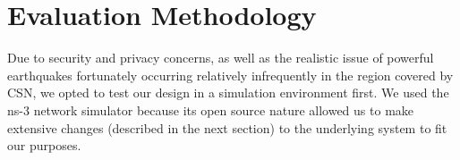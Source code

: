 \documentclass[conference]{IEEEtran}
\begin{document}



%
%
%

%





\section{Evaluation Methodology}
\label{methodology}

Due to security and privacy concerns, as well as the realistic issue of powerful earthquakes fortunately occurring relatively infrequently in the region covered by CSN, we opted to test our design in a simulation environment first.
We used the ns-3 \cite{ns3_site} network simulator because its open source nature allowed us to make extensive changes (described in the next section) to the underlying system to fit our purposes.
\end{document}
